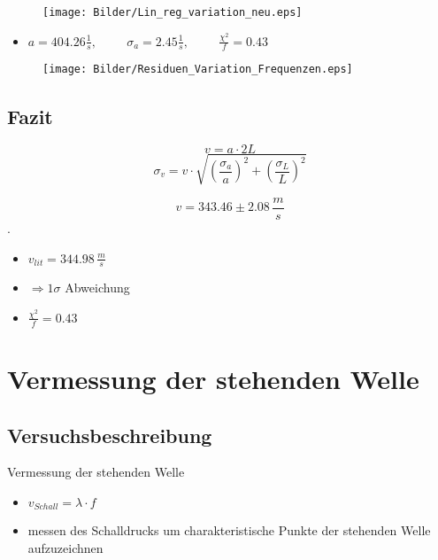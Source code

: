 \documentclass[11pt]{beamer}
\begin{document}
\begin{frame}
\begin{figure}[H]
\centering
\texttt{[image: Bilder/Lin\_reg\_variation\_neu.eps]}
\end{figure}

\begin{itemize}
\item $a=404.26 \frac{1}{s}, \hspace{1cm} \sigma_a = 2.45 \frac{1}{s}, \hspace{1cm} \frac{\chi^2}{f} = 0.43$
\end{itemize}
\end{frame}

\begin{frame}
\begin{figure}[H]
\centering
\texttt{[image: Bilder/Residuen\_Variation\_Frequenzen.eps]}
\end{figure}
\end{frame}


\subsection{Fazit}
\begin{frame}
\begin{equation*}
v=a\cdot 2L
\end{equation*}
\begin{equation*}
\sigma_v = v\cdot \sqrt{(\frac{\sigma_a}{a})^2+(\frac{\sigma_L}{L})^2}
\end{equation*}

\begin{equation*}
v = 343.46 \pm 2.08\,\frac{m}{s}
\end{equation*}.
\begin{itemize}
\item $v_{lit}=344.98\,\frac{m}{s}$
\item $\Rightarrow 1 \sigma$ Abweichung
\\
\item  $\frac{\chi^2}{f} = 0.43$
\end{itemize}
\end{frame}

\section{Vermessung der stehenden Welle}
\subsection{Versuchsbeschreibung}
\begin{frame}{Vermessung der stehenden Welle}
\begin{itemize}
\item $v_{Schall} = \lambda\cdot f$
\item messen des Schalldrucks um charakteristische Punkte der stehenden Welle aufzuzeichnen
\end{itemize}
\end{frame}
\end{document}
